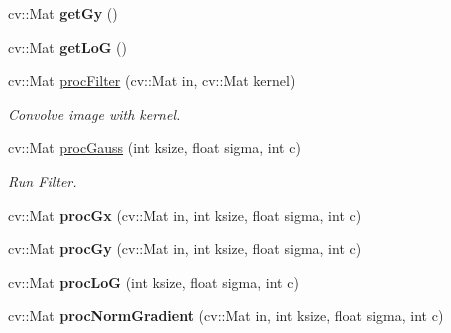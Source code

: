 \begin{DoxyCompactItemize}
\item 
cv\+::\+Mat {\bfseries get\+Gy} ()\hypertarget{classFilters_af7dacd92c7fe33930ce750d71a78c180}{}\label{classFilters_af7dacd92c7fe33930ce750d71a78c180}

\item 
cv\+::\+Mat {\bfseries get\+LoG} ()\hypertarget{classFilters_aaa60a7d6c730f64d8392e392faa07357}{}\label{classFilters_aaa60a7d6c730f64d8392e392faa07357}

\item 
cv\+::\+Mat \hyperlink{classFilters_a9473f368864da7596853b1c854ca52e5}{proc\+Filter} (cv\+::\+Mat in, cv\+::\+Mat kernel)\hypertarget{classFilters_a9473f368864da7596853b1c854ca52e5}{}\label{classFilters_a9473f368864da7596853b1c854ca52e5}

\begin{DoxyCompactList}\small\item\em Convolve image with kernel. \end{DoxyCompactList}\item 
cv\+::\+Mat \hyperlink{classFilters_a0adccec7973e15417195ebb495f27230}{proc\+Gauss} (int ksize, float sigma, int c)\hypertarget{classFilters_a0adccec7973e15417195ebb495f27230}{}\label{classFilters_a0adccec7973e15417195ebb495f27230}

\begin{DoxyCompactList}\small\item\em Run Filter. \end{DoxyCompactList}\item 
cv\+::\+Mat {\bfseries proc\+Gx} (cv\+::\+Mat in, int ksize, float sigma, int c)\hypertarget{classFilters_aec450acf6d2f8fa0e5150b45f359ce8d}{}\label{classFilters_aec450acf6d2f8fa0e5150b45f359ce8d}

\item 
cv\+::\+Mat {\bfseries proc\+Gy} (cv\+::\+Mat in, int ksize, float sigma, int c)\hypertarget{classFilters_a059ddcbe357b61d9202e4d371ffcc496}{}\label{classFilters_a059ddcbe357b61d9202e4d371ffcc496}

\item 
cv\+::\+Mat {\bfseries proc\+LoG} (int ksize, float sigma, int c)\hypertarget{classFilters_a47863aa8d5b323578753dff10ec16d05}{}\label{classFilters_a47863aa8d5b323578753dff10ec16d05}

\item 
cv\+::\+Mat {\bfseries proc\+Norm\+Gradient} (cv\+::\+Mat in, int ksize, float sigma, int c)\hypertarget{classFilters_af5c6d1d4edef0cdde6d7baa18ad66e33}{}\label{classFilters_af5c6d1d4edef0cdde6d7baa18ad66e33}


\end{DoxyCompactItemize}
